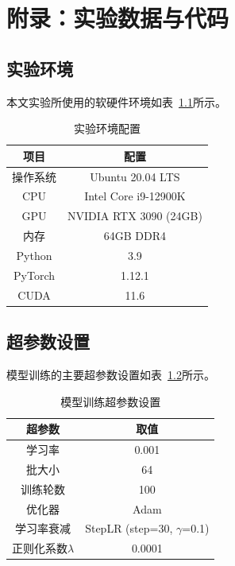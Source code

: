 \chapter{附录：实验数据与代码}

\section{实验环境}

本文实验所使用的软硬件环境如表~\ref{tab:env}所示。

\begin{table}[htbp]
	\centering
	\caption{实验环境配置}
	\label{tab:env}
	\begin{tabular}{cc}
		\toprule
		项目 & 配置 \\
		\midrule
		操作系统 & Ubuntu 20.04 LTS \\
		CPU & Intel Core i9-12900K \\
		GPU & NVIDIA RTX 3090 (24GB) \\
		内存 & 64GB DDR4 \\
		Python & 3.9 \\
		PyTorch & 1.12.1 \\
		CUDA & 11.6 \\
		\bottomrule
	\end{tabular}
\end{table}

\section{超参数设置}

模型训练的主要超参数设置如表~\ref{tab:hyperparams}所示。

\begin{table}[htbp]
	\centering
	\caption{模型训练超参数设置}
	\label{tab:hyperparams}
	\begin{tabular}{cc}
		\toprule
		超参数 & 取值 \\
		\midrule
		学习率 & 0.001 \\
		批大小 & 64 \\
		训练轮数 & 100 \\
		优化器 & Adam \\
		学习率衰减 & StepLR (step=30, $\gamma$=0.1) \\
		正则化系数$\lambda$ & 0.0001 \\
		\bottomrule
	\end{tabular}
\end{table}